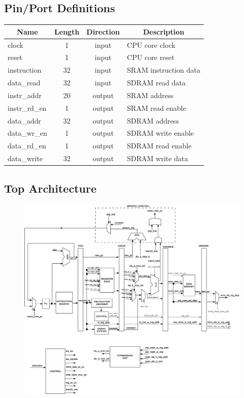 \documentclass{article}
\begin{document}
 
  \subsection{Pin/Port Definitions}
  \FloatBarrier
  \begin{table}[H]
    \begin{center}
      \begin{tabular}[pos]{| l | c | c | m{7cm} |} \hline 	
      \multicolumn{1}{|c|}{\cellcolor[gray]{0.9}\textbf{Name}} & 
      \multicolumn{1}{c|}{\cellcolor[gray]{0.9}\textbf{Length}} & 
      \multicolumn{1}{c|}{\cellcolor[gray]{0.9}\textbf{Direction}} &
      \multicolumn{1}{c|}{\cellcolor[gray]{0.9}\textbf{Description}} \\ \hline
	 clock 		& 1 	& input 	& CPU core clock  	\\ \hline
	 reset 		& 1	& input		& CPU core reset  	\\ \hline
	 instruction 	& 32	& input 	& SRAM instruction data \\ \hline
	 data\_read 	& 32	& input 	& SDRAM read data \\ \hline
	 instr\_addr 	& 20	& output 	& SRAM address \\ \hline
	 instr\_rd\_en 	& 1	& output 	& SRAM read enable  \\ \hline
	 data\_addr 	& 32	& output	& SDRAM address \\ \hline
	 data\_wr\_en 	& 1	& output 	& SDRAM write enable  \\ \hline
	 data\_rd\_en 	& 1	& output 	& SDRAM read enable  \\ \hline
   data\_write   & 32 & output  & SDRAM write data  \\ \hline
      \end{tabular}
    \end{center}
  \end{table}  


\begin{landscape}
  \subsection{Top Architecture}
    \begin{figure}[H]
      \centering
      \includegraphics[width=.7\linewidth]{pictures/top_architecture.eps}
    \end{figure}
  \end{landscape}
\end{document}
